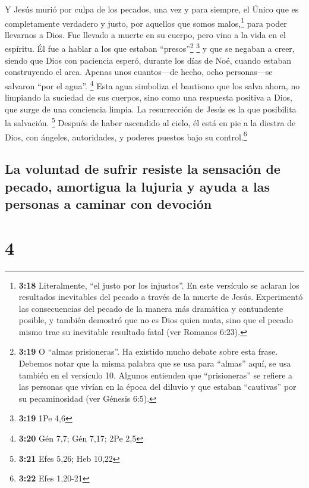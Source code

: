  Y Jesús murió por culpa de los pecados, una vez y para
siempre, el Único que es completamente verdadero y justo, por aquellos
que somos malos,\footnote{\textbf{3:18} Literalmente, ``el justo por los
  injustos''. En este versículo se aclaran los resultados inevitables
  del pecado a través de la muerte de Jesús. Experimentó las
  consecuencias del pecado de la manera más dramática y contundente
  posible, y también demostró que no es Dios quien mata, sino que el
  pecado mismo trae su inevitable resultado fatal (ver Romanos 6:23).}
para poder llevarnos a Dios. Fue llevado a muerte en su cuerpo, pero
vino a la vida en el espíritu.  Él fue a hablar a los que
estaban ``presos''\footnote{\textbf{3:19} O ``almas prisioneras''. Ha
  existido mucho debate sobre esta frase. Debemos notar que la misma
  palabra que se usa para ``almas'' aquí, se usa también en el versículo
  10. Algunos entienden que ``prisioneras'' se refiere a las personas
  que vivían en la época del diluvio y que estaban ``cautivas'' por su
  pecaminosidad (ver Génesis 6:5).} \footnote{\textbf{3:19} 1Pe 4,6}
 y que se negaban a creer, siendo que Dios con paciencia
esperó, durante los días de Noé, cuando estaban construyendo el arca.
Apenas unos cuantos---de hecho, ocho personas---se salvaron ``por el
agua''. \footnote{\textbf{3:20} Gén 7,7; Gén 7,17; 2Pe 2,5}
 Esta agua simboliza el bautismo que los salva ahora, no
limpiando la suciedad de sus cuerpos, sino como una respuesta positiva a
Dios, que surge de una conciencia limpia. La resurrección de Jesús es la
que posibilita la salvación. \footnote{\textbf{3:21} Efes 5,26; Heb
  10,22}  Después de haber ascendido al cielo, él está en
pie a la diestra de Dios, con ángeles, autoridades, y poderes puestos
bajo su control.\footnote{\textbf{3:22} Efes 1,20-21}

\hypertarget{la-voluntad-de-sufrir-resiste-la-sensaciuxf3n-de-pecado-amortigua-la-lujuria-y-ayuda-a-las-personas-a-caminar-con-devociuxf3n}{%
\subsection{La voluntad de sufrir resiste la sensación de pecado,
amortigua la lujuria y ayuda a las personas a caminar con
devoción}\label{la-voluntad-de-sufrir-resiste-la-sensaciuxf3n-de-pecado-amortigua-la-lujuria-y-ayuda-a-las-personas-a-caminar-con-devociuxf3n}}

\hypertarget{section-3}{%
\section{4}\label{section-3}}

